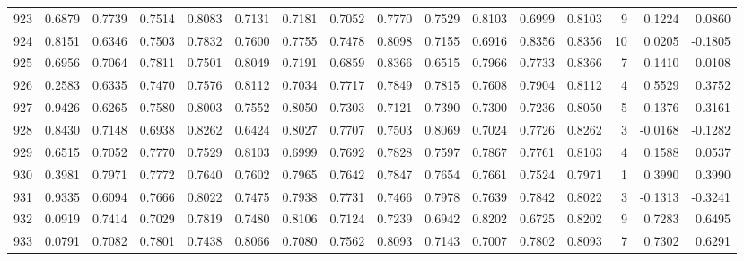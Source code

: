 \begin{tabular}{lrrrrrrrrrrrrrrr}
923 &      0.6879 &  0.7739 &  0.7514 &  0.8083 &  0.7131 &  0.7181 &  0.7052 &  0.7770 &  0.7529 &  0.8103 &   0.6999 &     0.8103 &      9 &                    0.1224 &                     0.0860 \\
924 &      0.8151 &  0.6346 &  0.7503 &  0.7832 &  0.7600 &  0.7755 &  0.7478 &  0.8098 &  0.7155 &  0.6916 &   0.8356 &     0.8356 &     10 &                    0.0205 &                    -0.1805 \\
925 &      0.6956 &  0.7064 &  0.7811 &  0.7501 &  0.8049 &  0.7191 &  0.6859 &  0.8366 &  0.6515 &  0.7966 &   0.7733 &     0.8366 &      7 &                    0.1410 &                     0.0108 \\
926 &      0.2583 &  0.6335 &  0.7470 &  0.7576 &  0.8112 &  0.7034 &  0.7717 &  0.7849 &  0.7815 &  0.7608 &   0.7904 &     0.8112 &      4 &                    0.5529 &                     0.3752 \\
927 &      0.9426 &  0.6265 &  0.7580 &  0.8003 &  0.7552 &  0.8050 &  0.7303 &  0.7121 &  0.7390 &  0.7300 &   0.7236 &     0.8050 &      5 &                   -0.1376 &                    -0.3161 \\
928 &      0.8430 &  0.7148 &  0.6938 &  0.8262 &  0.6424 &  0.8027 &  0.7707 &  0.7503 &  0.8069 &  0.7024 &   0.7726 &     0.8262 &      3 &                   -0.0168 &                    -0.1282 \\
929 &      0.6515 &  0.7052 &  0.7770 &  0.7529 &  0.8103 &  0.6999 &  0.7692 &  0.7828 &  0.7597 &  0.7867 &   0.7761 &     0.8103 &      4 &                    0.1588 &                     0.0537 \\
930 &      0.3981 &  0.7971 &  0.7772 &  0.7640 &  0.7602 &  0.7965 &  0.7642 &  0.7847 &  0.7654 &  0.7661 &   0.7524 &     0.7971 &      1 &                    0.3990 &                     0.3990 \\
931 &      0.9335 &  0.6094 &  0.7666 &  0.8022 &  0.7475 &  0.7938 &  0.7731 &  0.7466 &  0.7978 &  0.7639 &   0.7842 &     0.8022 &      3 &                   -0.1313 &                    -0.3241 \\
932 &      0.0919 &  0.7414 &  0.7029 &  0.7819 &  0.7480 &  0.8106 &  0.7124 &  0.7239 &  0.6942 &  0.8202 &   0.6725 &     0.8202 &      9 &                    0.7283 &                     0.6495 \\
933 &      0.0791 &  0.7082 &  0.7801 &  0.7438 &  0.8066 &  0.7080 &  0.7562 &  0.8093 &  0.7143 &  0.7007 &   0.7802 &     0.8093 &      7 &                    0.7302 &                     0.6291 \\

\end{tabular}
